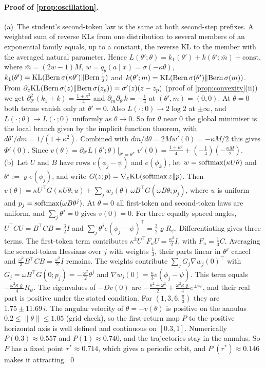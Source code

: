 \paragraph{Proof of \cref{prop:oscillation}.}
(a)~The student's second-token law is the same at both second-step prefixes. A weighted sum of reverse KLs from one
distribution to several members of an exponential family equals, up to a constant, the reverse KL to the member
with the averaged natural parameter. Hence
$L(\theta';\theta)=k_1(\theta')+k(\theta';\bar m)+\mathrm{const}$, where $\bar m=(2w-1)M$, $w=q_\theta(a\mid x)=\sigma(-\kappa\theta)$,
$k_1(\theta')=\mathrm{KL}(\mathrm{Bern}\,\sigma(\kappa\theta')\|\mathrm{Bern}\,\frac12)$ and $k(\theta';m)=\mathrm{KL}(\mathrm{Bern}\,\sigma(\theta')\|\mathrm{Bern}\,\sigma(m))$. From
$\partial_z\mathrm{KL}(\mathrm{Bern}\,\sigma(z)\|\mathrm{Bern}\,\sigma(z_p))=\sigma'(z)(z-z_p)$ (proof of \cref{prop:convexity}(ii)) we get
$\partial^2_{\theta'}(k_1+k)=\frac{1+\kappa^2}4$ and $\partial_m\partial_{\theta'}k=-\frac14$ at $(\theta',m)=(0,0)$. At $\theta=0$ both terms vanish only at $\theta'=0$. Also
$L(\cdot\,;0)\to2\log2$ at $\pm\infty$, and $L(\cdot\,;\theta)\to L(\cdot\,;0)$ uniformly as $\theta\to0$. So for $\theta$ near $0$ the global minimiser is the local
branch given by the implicit function theorem, with $d\theta'/d\bar m=1/(1+\kappa^2)$. Combined with $d\bar m/d\theta=2Mw'(0)=-\kappa M/2$ this gives
$\Phi'(0)$. Since $v(\theta)=\partial_{\theta'}L(\theta';\theta)|_{\theta'=\theta}$, $v'(0)=\frac{1+\kappa^2}4+(-\frac14)(-\frac{\kappa M}2)$.
(b)~Let $U$ and $B$ have rows $e(\phi_j-\psi)$ and $e(\phi_k)$, let $w=\operatorname{softmax}(\kappa U\theta)$ and $\theta^j:=\varrho e(\phi_j)$, and write $G(z;p)=\nabla_z\mathrm{KL}(\operatorname{softmax} z\|p)$. Then
$v(\theta)=\kappa U^\top G(\kappa U\theta;u)+\sum_jw_j(\theta)\,\omega B^\top G(\omega B\theta;p_j)$, where $u$ is uniform and $p_j=\operatorname{softmax}(\omega B\theta^j)$. At $\theta=0$ all first-token and
second-token laws are uniform, and $\sum_j\theta^j=0$ gives $v(0)=0$. For three equally spaced angles, $U^\top CU=B^\top CB=\frac32I$ and
$\sum_j\theta^j e(\phi_j-\psi)^\top=\frac32\varrho R_\psi$. Differentiating gives three terms. The first-token term contributes
$\kappa^2U^\top F_uU=\frac{\kappa^2}2I$, with $F_u=\frac13C$. Averaging the second-token Hessians over $j$ with weights $\frac13$, their parts linear in
$\theta^j$ cancel and $\frac{\omega^2}{3}B^\top CB=\frac{\omega^2}2I$ remains. The weights contribute
$\sum_jG_j\nabla w_j(0)^\top$ with $G_j=\omega B^\top G(0;p_j)=-\frac{\omega^2}2\theta^j$ and $\nabla w_j(0)=\frac\kappa3e(\phi_j-\psi)$. This term equals
$-\frac{\omega^2\kappa\varrho}4R_\psi$. The eigenvalues of $-Dv(0)$ are $-\frac{\kappa^2+\omega^2}2+\frac{\omega^2\kappa\varrho}4e^{\pm i\psi}$, and their real part is positive under the
stated condition. For $(1,3,6,\frac\pi3)$ they are $1.75\pm11.69\,i$. The angular velocity of $\dot\theta=-v(\theta)$ is positive on the annulus
$0.2\le\|\theta\|\le1.05$ (grid check), so the first-return map $P$ to the positive horizontal axis is well defined and
continuous on $[0.3,1]$. Numerically $P(0.3)\approx0.557$ and $P(1)\approx0.740$, and the trajectories stay in the annulus. So $P$ has a fixed
point $r^\ast\approx0.714$, which gives a periodic orbit, and $P'(r^\ast)\approx0.146$ makes it attracting. \qed

